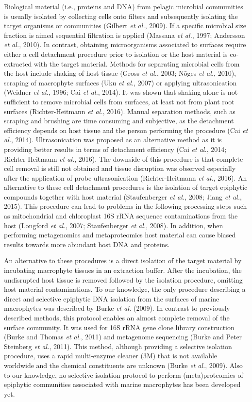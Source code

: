 \documentclass[12pt,]{article}
\begin{document}
Biological material (i.e., proteins and DNA) from pelagic microbial
communities is usually isolated by collecting cells onto filters and
subsequently isolating the target organisms or communities (Gilbert
\emph{et al.}, 2009). If a specific microbial size fraction is aimed
sequential filtration is applied (Massana \emph{et al.}, 1997; Andersson
\emph{et al.}, 2010). In contrast, obtaining microorganisms associated
to surfaces require either a cell detachment procedure prior to
isolation or the host material is co-extracted with the target material.
Methods for separating microbial cells from the host include shaking of
host tissue (Gross \emph{et al.}, 2003; Nõges \emph{et al.}, 2010),
scraping of macrophyte surfaces (Uku \emph{et al.}, 2007) or applying
ultrasonication (Weidner \emph{et al.}, 1996; Cai \emph{et al.}, 2014).
It was shown that shaking alone is not sufficient to remove microbial
cells from surfaces, at least not from plant root surfaces
(Richter-Heitmann \emph{et al.}, 2016). Manual separation methods, such
as scraping and brushing are time consuming and subjective, as the
detachment efficiency depends on host tissue and the person performing
the procedure (Cai \emph{et al.}, 2014). Ultrasonication was proposed as
an alternative method as it is providing better results in terms of
detachment efficiency (Cai \emph{et al.}, 2014; Richter-Heitmann
\emph{et al.}, 2016). The downside of this procedure is that complete
cell removal is still not obtained and tissue disruption was observed
especially after the application of probe ultrasonication
(Richter-Heitmann \emph{et al.}, 2016). An alternative to these cell
detachment procedures is the isolation of target epiphytic compounds
together with host material (Staufenberger \emph{et al.}, 2008; Jiang
\emph{et al.}, 2015). This procedure can lead to problems in the
following processing steps such as mitochondrial and chloroplast 16S
rRNA sequence contaminations from the host (Longford \emph{et al.},
2007; Staufenberger \emph{et al.}, 2008). In addition, when performing
metagenomics and metaproteomics host material can cause biased results
towards more abundant host DNA and proteins.

An alternative to these procedures is a direct isolation of the target
material by incubating macrophyte tissues in an extraction buffer. After
the incubation, the undisrupted host tissue is removed followed by the
isolation procedure, omitting host material contaminations. To our
knowledge, the only procedure describing a direct and selective
epiphytic DNA isolation from the surfaces of marine macrophytes was
described by Burke \emph{et al.} (2009). In contrast to previously
described methods, this protocol enables an almost complete removal of
the surface community. It was used for 16S rRNA gene clone library
construction (Burke and Thomas \emph{et al.}, 2011) and metagenome
sequencing (Burke and Peter Steinberg \emph{et al.}, 2011). This method,
although providing a selective isolation procedure, uses a rapid
multi-enzyme cleaner (3M) that is not available worldwide and the
chemical constituents are unknown (Burke \emph{et al.}, 2009). Also to
our knowledge, no selective isolation protocol to perform
(meta)proteomics of epiphytic communities associated with marine
macrophytes has been developed yet.
\end{document}
